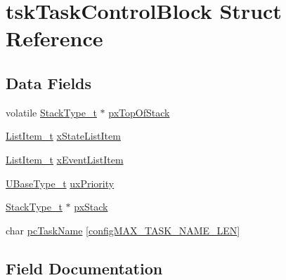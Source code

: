 \hypertarget{structtsk_task_control_block}{}\section{tsk\+Task\+Control\+Block Struct Reference}
\label{structtsk_task_control_block}
\subsection*{Data Fields}
\begin{DoxyCompactItemize}
\item 
volatile \mbox{\hyperlink{portmacro_8h_a84e9a8ba132feed0b2401c1f4e2ac63c}{Stack\+Type\+\_\+t}} $\ast$ \mbox{\hyperlink{structtsk_task_control_block_a41989bc39d576125f4492364592f9e1a}{px\+Top\+Of\+Stack}}
\item 
\mbox{\hyperlink{list_8h_a1a62d469392f9bfe2443e7efab9c8398}{List\+Item\+\_\+t}} \mbox{\hyperlink{structtsk_task_control_block_a2575f6a579ef61db0db66d7b1b52ec48}{x\+State\+List\+Item}}
\item 
\mbox{\hyperlink{list_8h_a1a62d469392f9bfe2443e7efab9c8398}{List\+Item\+\_\+t}} \mbox{\hyperlink{structtsk_task_control_block_a139605d93d834601f34be927ecba3a15}{x\+Event\+List\+Item}}
\item 
\mbox{\hyperlink{portmacro_8h_a646f89d4298e4f5afd522202b11cb2e6}{U\+Base\+Type\+\_\+t}} \mbox{\hyperlink{structtsk_task_control_block_a0befed3dd0fe55b4314158f4814f50ae}{ux\+Priority}}
\item 
\mbox{\hyperlink{portmacro_8h_a84e9a8ba132feed0b2401c1f4e2ac63c}{Stack\+Type\+\_\+t}} $\ast$ \mbox{\hyperlink{structtsk_task_control_block_aaecd48bdf732c1df94b258956ca85bd7}{px\+Stack}}
\item 
char \mbox{\hyperlink{structtsk_task_control_block_afa7d65deeca135b921eaa78fbbf52918}{pc\+Task\+Name}} \mbox{[}\mbox{\hyperlink{_free_r_t_o_s_config_8h_ac388dc4041aab6997348828eb27fc1a8}{config\+M\+A\+X\+\_\+\+T\+A\+S\+K\+\_\+\+N\+A\+M\+E\+\_\+\+L\+EN}}\mbox{]}
\end{DoxyCompactItemize}


\subsection{Field Documentation}
\mbox{\label{structtsk_task_control_block_afa7d65deeca135b921eaa78fbbf52918}} 
